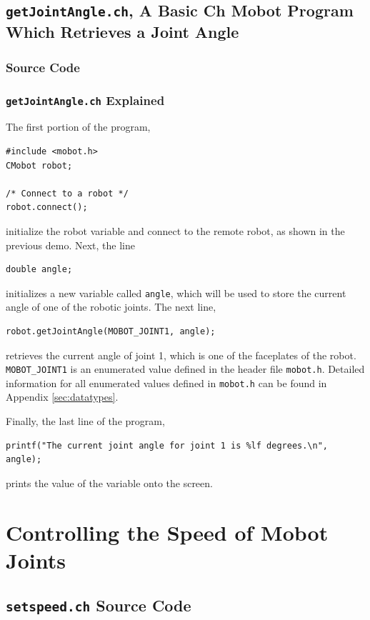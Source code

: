 \documentclass{article}
\begin{document}
\subsection{\texttt{getJointAngle.ch}, A Basic Ch Mobot Program Which Retrieves a Joint Angle}
\subsubsection{Source Code}


\subsubsection{\texttt{getJointAngle.ch} Explained}
The first portion of the program, 
\begin{verbatim}
#include <mobot.h>
CMobot robot;

/* Connect to a robot */
robot.connect();
\end{verbatim}
initialize the robot variable and connect to the remote robot, as shown in the
previous demo. Next, the line
\begin{verbatim}
double angle;
\end{verbatim}
initializes a new variable called \texttt{angle}, which will be used to store
the current angle of one of the robotic joints. The next line,
\begin{verbatim}
robot.getJointAngle(MOBOT_JOINT1, angle);
\end{verbatim}
retrieves the current angle of joint 1, which is one of the faceplates of the
robot. 
\texttt{MOBOT\_JOINT1} is an enumerated value
defined in the header file \texttt{mobot.h}. Detailed information
for all enumerated values defined in \texttt{mobot.h} can be found in 
Appendix \ref{sec:datatypes}.

Finally, the last line of the program,
\begin{verbatim}
printf("The current joint angle for joint 1 is %lf degrees.\n", angle);
\end{verbatim}
prints the value of the variable onto the screen. 


\section{Controlling the Speed of Mobot Joints}
\subsection{\texttt{setspeed.ch} Source Code}

\end{document}
